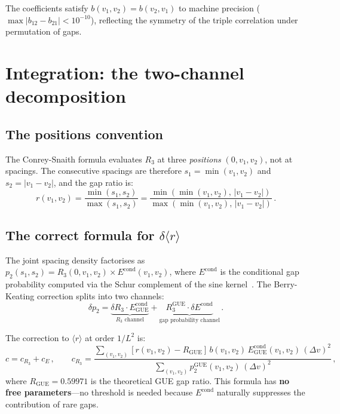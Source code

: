 \documentclass[11pt]{article}
\begin{document}
The coefficients satisfy $b(v_1, v_2) = b(v_2, v_1)$ to machine precision
($\max |b_{12} - b_{21}| < 10^{-10}$), reflecting the symmetry of the
triple correlation under permutation of gaps.


\section{Integration: the two-channel decomposition}
\label{sec:integration}

\subsection{The positions convention}

The Conrey-Snaith formula evaluates $R_3$ at three \emph{positions}
$(0, v_1, v_2)$, not at spacings. The consecutive spacings are therefore
$s_1 = \min(v_1, v_2)$ and $s_2 = |v_1 - v_2|$, and the gap ratio is:
\begin{equation}
r(v_1, v_2) = \frac{\min(s_1, s_2)}{\max(s_1, s_2)}
= \frac{\min(\min(v_1,v_2),\, |v_1-v_2|)}{\max(\min(v_1,v_2),\, |v_1-v_2|)}\,.
\label{eq:r_correct}
\end{equation}

\subsection{The correct formula for $\delta\langle r\rangle$}

The joint spacing density factorises as
$p_2(s_1, s_2) = R_3(0, v_1, v_2) \times E^{\mathrm{cond}}(v_1, v_2)$,
where $E^{\mathrm{cond}}$ is the conditional gap probability computed via
the Schur complement of the sine kernel~\cite{bornemann2010}.
The Berry-Keating correction splits into two channels:
\begin{equation}
\delta p_2 = \underbrace{\delta R_3 \cdot E^{\mathrm{cond}}_{\mathrm{GUE}}}_{\text{$R_3$ channel}}
+ \underbrace{R_3^{\mathrm{GUE}} \cdot \delta E^{\mathrm{cond}}}_{\text{gap probability channel}}\,.
\label{eq:two_channels}
\end{equation}

The correction to $\langle r\rangle$ at order $1/L^2$ is:
\begin{equation}
c = c_{R_3} + c_E\,, \qquad
c_{R_3} = \frac{\displaystyle\sum_{(v_1,v_2)} [r(v_1,v_2) - R_{\mathrm{GUE}}]\,
b(v_1,v_2)\, E^{\mathrm{cond}}_{\mathrm{GUE}}(v_1,v_2)\, (\Delta v)^2}
{\displaystyle\sum_{(v_1,v_2)} p_2^{\mathrm{GUE}}(v_1,v_2)\, (\Delta v)^2}\,,
\label{eq:c_R3}
\end{equation}
where $R_{\mathrm{GUE}} = 0.59971$ is the theoretical GUE gap ratio.
This formula has \textbf{no free parameters}---no threshold is needed because
$E^{\mathrm{cond}}$ naturally suppresses the contribution of rare gaps.
\end{document}
